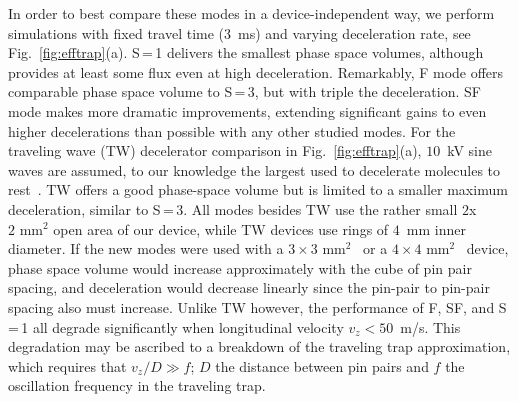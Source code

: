\documentclass[%
 reprint,
 amsmath,amssymb,
 aps,
prl,
]{revtex4-1}
\begin{document}
In order to best compare these modes in a device-independent way, we perform simulations with fixed travel time ($3$~ms) and varying deceleration rate, see Fig.~\ref{fig:efftrap}(a).
S\,=\,1 delivers the smallest phase space volumes, although provides at least some flux even at high deceleration.
Remarkably, F mode offers comparable phase space volume to S\,=\,3, but with triple the deceleration.
SF mode makes more dramatic improvements, extending significant gains to even higher decelerations than possible with any other studied modes.
For the traveling wave (TW) decelerator comparison in Fig.~\ref{fig:efftrap}(a), $10$~kV sine waves are assumed, to our knowledge the largest used to decelerate molecules to rest~\cite{Quintero-Perez2013}. TW offers a good phase-space volume but is limited to a smaller maximum deceleration, similar to S\,=\,3.  
All modes besides TW use the rather small $2$x$2\text{ mm}^2$ open area of our device, while TW devices use rings of $4$~mm inner diameter.
If the new modes were used with a $3\times3\text{ mm}^2$~\cite{Scharfenberg2009} or a $4\times4\text{ mm}^2$~\cite{VandeMeerakker2005} device, phase space volume would increase approximately with the cube of pin pair spacing, and deceleration would decrease linearly since the pin-pair to pin-pair spacing also must increase.
Unlike TW however, the performance of F, SF, and S\,=\,1 all degrade significantly when longitudinal velocity $v_z < 50$~m/s. 
This degradation may be ascribed to a breakdown of the traveling trap approximation, which requires that $v_z/D \gg f$; $D$ the distance between pin pairs and $f$ the oscillation frequency in the traveling trap.
\end{document}
